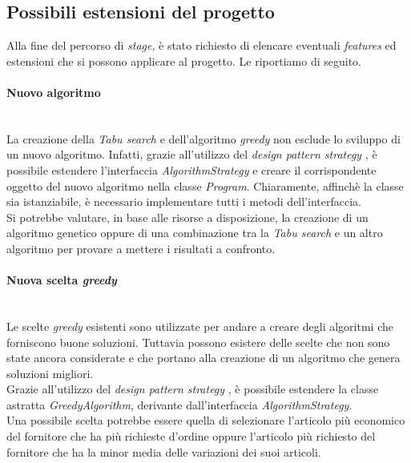 \subsection{Possibili estensioni del progetto}
\label{sec:estensioni-progetto}
\noindent Alla fine del percorso di \textit{stage}, è stato richiesto di
elencare eventuali \textit{features} ed estensioni che si possono
applicare al progetto. Le riportiamo di seguito.
\vspace*{0.3cm}
\noindent \paragraph{Nuovo algoritmo}\hfill\\
La creazione della \textit{Tabu search} e dell'algoritmo \textit{greedy} non esclude
lo sviluppo di un nuovo algoritmo. Infatti, grazie all'utilizzo del \textit{design
pattern strategy} \cite{siteG:refactoring-guru} \cite{siteH:rcardin}, è possibile estendere l'interfaccia
\textit{AlgorithmStrategy} e 
creare il corrispondente oggetto del nuovo algoritmo nella classe \textit{Program}.
Chiaramente, affinchè la classe sia istanziabile, è necessario
implementare tutti i metodi dell'interfaccia.\\
Si potrebbe valutare, in base alle risorse a disposizione, la creazione di un
algoritmo genetico oppure di una combinazione tra la \textit{Tabu search} e un altro algoritmo
per provare a mettere i risultati a confronto.
\vspace*{0.3cm}
\noindent \paragraph{Nuova scelta \textit{greedy}}\hfill\\
Le scelte \textit{greedy} esistenti sono utilizzate per andare
a creare degli algoritmi che forniscono buone soluzioni.
Tuttavia possono esistere delle scelte che non sono state ancora
considerate e che portano alla creazione di un algoritmo
che genera soluzioni migliori.\\
Grazie all'utilizzo del \textit{design
pattern strategy} \cite{siteG:refactoring-guru} \cite{siteH:rcardin}, è possibile estendere
la classe astratta \textit{GreedyAlgorithm}, derivante dall'interfaccia
\textit{AlgorithmStrategy}.\\
Una possibile scelta potrebbe essere quella di selezionare
l'articolo più economico del fornitore che ha più richieste d'ordine
oppure l'articolo più richiesto del fornitore
che ha la minor media delle variazioni dei suoi articoli.
